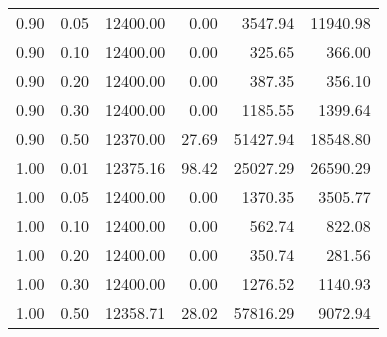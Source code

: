 \begin{table}
\begin{tabular}{rrrrrr}
0.90 & 0.05 & 12400.00 & 0.00 & 3547.94 & 11940.98 \\
0.90 & 0.10 & 12400.00 & 0.00 & 325.65 & 366.00 \\
0.90 & 0.20 & 12400.00 & 0.00 & 387.35 & 356.10 \\
0.90 & 0.30 & 12400.00 & 0.00 & 1185.55 & 1399.64 \\
0.90 & 0.50 & 12370.00 & 27.69 & 51427.94 & 18548.80 \\
1.00 & 0.01 & 12375.16 & 98.42 & 25027.29 & 26590.29 \\
1.00 & 0.05 & 12400.00 & 0.00 & 1370.35 & 3505.77 \\
1.00 & 0.10 & 12400.00 & 0.00 & 562.74 & 822.08 \\
1.00 & 0.20 & 12400.00 & 0.00 & 350.74 & 281.56 \\
1.00 & 0.30 & 12400.00 & 0.00 & 1276.52 & 1140.93 \\
1.00 & 0.50 & 12358.71 & 28.02 & 57816.29 & 9072.94 \\
\bottomrule
\end{tabular}
\end{table}
